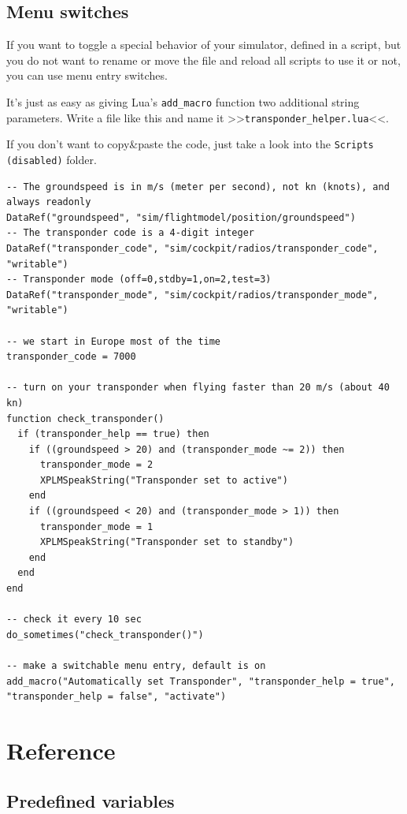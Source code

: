 \documentclass[11pt,parskip=half,a4paper]{scrartcl}
\begin{document}
\subsection{Menu switches}

If you want to toggle a special behavior of your simulator, defined in a script, but you do not want to rename or move the file and reload all scripts to use it or not, you can use menu entry switches.

It's just as easy as giving Lua's \verb|add_macro| function two additional string parameters. Write a file like this and name it >>\verb|transponder_helper.lua|<<.

If you don't want to copy\&paste the code, just take a look into the \verb|Scripts (disabled)| folder.

\begin{lstlisting}
-- The groundspeed is in m/s (meter per second), not kn (knots), and always readonly
DataRef("groundspeed", "sim/flightmodel/position/groundspeed")
-- The transponder code is a 4-digit integer
DataRef("transponder_code", "sim/cockpit/radios/transponder_code", "writable")
-- Transponder mode (off=0,stdby=1,on=2,test=3)
DataRef("transponder_mode", "sim/cockpit/radios/transponder_mode", "writable")

-- we start in Europe most of the time
transponder_code = 7000

-- turn on your transponder when flying faster than 20 m/s (about 40 kn)
function check_transponder()
  if (transponder_help == true) then
    if ((groundspeed > 20) and (transponder_mode ~= 2)) then
      transponder_mode = 2
      XPLMSpeakString("Transponder set to active")
    end
    if ((groundspeed < 20) and (transponder_mode > 1)) then
      transponder_mode = 1
      XPLMSpeakString("Transponder set to standby")
    end
  end
end

-- check it every 10 sec
do_sometimes("check_transponder()")

-- make a switchable menu entry, default is on
add_macro("Automatically set Transponder", "transponder_help = true", "transponder_help = false", "activate")
\end{lstlisting}

\newpage
\section{Reference}
\subsection{Predefined variables}
\end{document}
